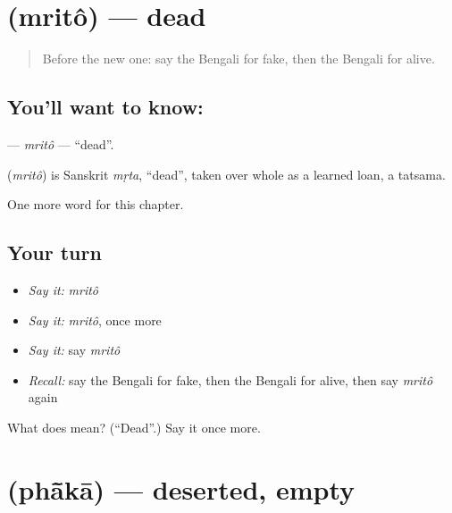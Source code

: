 \section[\texorpdfstring{\bn{মৃত} (mritô)}{মৃত (mritô)}]{ (mritô) — dead}

\label{lesson:BN-C219-mrito}



\begin{quote}
Before the new one: say the Bengali for fake, then the Bengali for alive.
\end{quote}

\subsection*{You'll want to know: }
\textbf{} — \emph{mritô} — \textquotedblleft{}dead\textquotedblright{}.

\begin{cousinweb}
\textbf{} (\emph{mritô}) is Sanskrit \emph{mṛta}, \textquotedblleft{}dead\textquotedblright{}, taken over whole as a learned loan, a tatsama.
\end{cousinweb}

\begin{grammarlens}[title={What you've built}]
One more word for this chapter.
\end{grammarlens}

\subsection*{Your turn}
\begin{itemize}
\raggedright
  \item \emph{Say it:} \emph{mritô}
  \item \emph{Say it:} \emph{mritô}, once more
  \item \emph{Say it:} say \emph{mritô}
  \item \emph{Recall:} say the Bengali for fake, then the Bengali for alive, then say \emph{mritô} again
\end{itemize}

\begin{tcolorbox}[breakable,colback=teal!4,colframe=teal!35!black,title={Before you move on}]
What does  mean? (\textquotedblleft{}Dead\textquotedblright{}.) Say it once more.
\end{tcolorbox}
\section[\texorpdfstring{\bn{ফাঁকা} (phā̃kā)}{ফাঁকা (phā̃kā)}]{ (phā̃kā) — deserted, empty}

